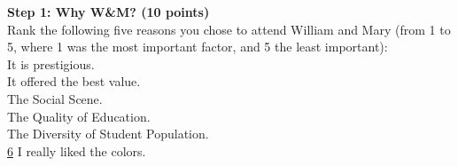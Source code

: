 \documentclass{article}
\begin{document}
\vspace{3mm}
\textbf{Step 1: Why W\&M? (10 points)}\\
Rank the following five reasons you chose to attend William and Mary (from 1 to 5, where 1 was the most important factor, and 5 the least important):\\
\underline{\hspace{0.35cm}} It is prestigious.\\
\underline{\hspace{0.35cm}} It offered the best value.\\
\underline{\hspace{0.35cm}} The Social Scene. \\
\underline{\hspace{0.35cm}} The Quality of Education. \\
\underline{\hspace{0.35cm}} The Diversity of Student Population.\\
\underline{\hspace{0.05cm}}\underline{6}\underline{\hspace{0.1cm}}  I really liked the colors.\\
\end{document}

